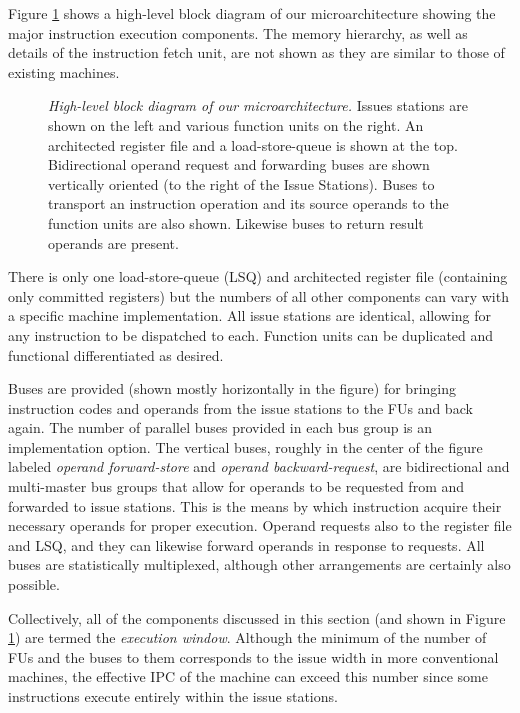 \documentclass[10pt,twocolumn,dvips]{article}
\begin{document}
Figure \ref{fig:overview} shows a high-level block diagram
of our microarchitecture showing the major instruction execution components.
The memory hierarchy, as well as details of the instruction fetch
unit, are not shown as they are similar to those of existing
machines.
%
\begin{figure}
\scriptsize {
}
\caption{{\em High-level block diagram of our microarchitecture.} 
Issues stations are shown on the left and various function
units on the right.  An architected register file and a
load-store-queue is shown at the top.
Bidirectional operand request and forwarding buses are shown
vertically oriented (to the right of the Issue Stations).
Buses to transport an instruction operation and its source operands
to the function units are also shown. 
Likewise buses to return result operands are present.}
\label{fig:overview}
\end{figure}
%
There is only one load-store-queue (LSQ) and
architected register file (containing only
committed registers) but the numbers of all other components can
vary with a specific machine implementation.
All issue stations are identical, allowing for any
instruction to be dispatched to each.
Function units can be duplicated and functional differentiated
as desired. 

Buses are provided (shown mostly horizontally in the figure)
for bringing instruction codes and operands from the issue
stations to the FUs and back again.
The number of parallel buses provided in each bus group is
an implementation option.
The vertical buses, roughly in the center of the figure
labeled \textit{operand forward-store} and
\textit{operand backward-request}, are
bidirectional and multi-master bus groups that
allow for operands to be requested from and forwarded to
issue stations.
This is the means by which instruction acquire their necessary
operands for proper execution.
Operand requests also to the register file and LSQ, and they
can likewise forward operands in response to requests.
All buses are statistically multiplexed, although other
arrangements are certainly also possible.

Collectively, all of the components discussed in this section
(and shown in 
Figure \ref{fig:overview}) are termed the \textit{execution window}.
Although the minimum of the number of FUs and the buses to them
corresponds to the issue width in more conventional machines,
the effective IPC of the machine can exceed this number since
some instructions
execute entirely within the issue stations.
%
\vspace{-0.15in}
\end{document}

